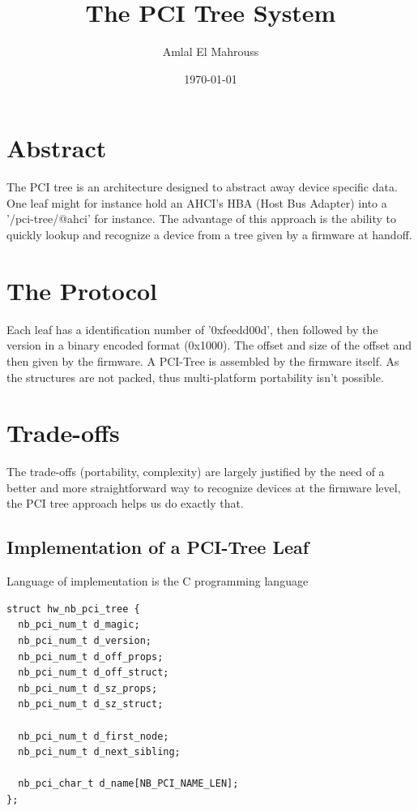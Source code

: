 \documentclass{article}
\title{The PCI Tree System}
\author{Amlal El Mahrouss}
\date{\today}
\begin{document}
\maketitle

\section{Abstract}

The PCI tree is an architecture designed to abstract away device specific data. One leaf might for instance hold an AHCI's HBA (Host Bus Adapter) into a '/pci-tree/@ahci' for instance. The advantage of this approach is the ability to quickly lookup and recognize a device from a tree given by a firmware at handoff.

\section{The Protocol}

Each leaf has a identification number of '0xfeedd00d', then followed by the version in a binary encoded format (0x1000). The offset and size of the offset and then given by the firmware. A PCI-Tree is assembled by the firmware itself. As the structures are not packed, thus multi-platform portability isn't possible.

\section{Trade-offs}

The trade-offs (portability, complexity) are largely justified by the need of a better and more straightforward way to recognize devices at the firmware level, the PCI tree approach helps us do exactly that.

\subsection{Implementation of a PCI-Tree Leaf}

Language of implementation is the C programming language

\begin{lstlisting}
struct hw_nb_pci_tree {
  nb_pci_num_t d_magic;
  nb_pci_num_t d_version;
  nb_pci_num_t d_off_props;
  nb_pci_num_t d_off_struct;
  nb_pci_num_t d_sz_props;
  nb_pci_num_t d_sz_struct;

  nb_pci_num_t d_first_node;
  nb_pci_num_t d_next_sibling;

  nb_pci_char_t d_name[NB_PCI_NAME_LEN];
};

\end{lstlisting}
\end{document}
